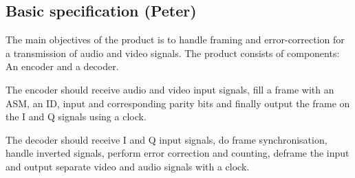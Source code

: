 \subsection{Basic specification (Peter)}
The main objectives of the product is to handle framing and error-correction for a transmission of audio and video signals. The product consists of components: An encoder and a decoder.

The encoder should receive audio and video input signals, fill a frame with an ASM, an ID, input and corresponding parity bits and finally output the frame on the I and Q signals using a clock.

The decoder should receive I and Q input signals, do frame synchronisation, handle inverted signals, perform error correction and counting, deframe the input and output separate video and audio signals with a clock.
